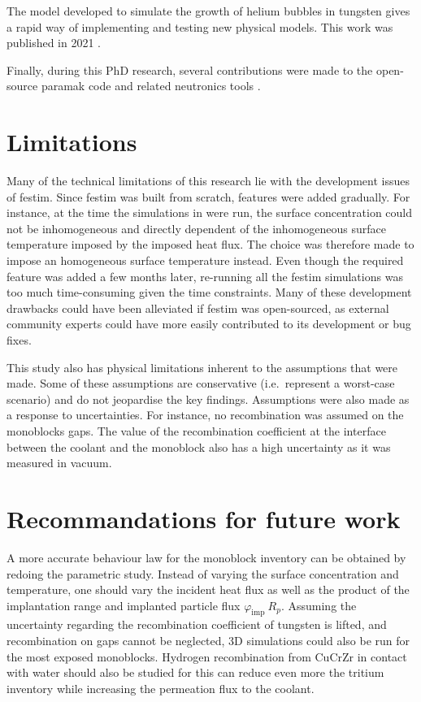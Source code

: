 The model developed to simulate the growth of helium bubbles in tungsten gives a rapid way of implementing and testing new physical models.
This work was published in 2021 \cite{delaporte-mathurin_influence_2021}.

Finally, during this PhD research, several contributions were made to the open-source \gls{paramak} code and related neutronics tools \cite{shimwell_paramak_2021}.

\section*{Limitations}

Many of the technical limitations of this research lie with the development issues of \gls{festim}.
Since \gls{festim} was built from scratch, features were added gradually.
For instance, at the time the simulations in  were run, the surface concentration could not be inhomogeneous and directly dependent of the inhomogeneous surface temperature imposed by the imposed heat flux.
The choice was therefore made to impose an homogeneous surface temperature instead.
Even though the required feature was added a few months later, re-running all the \gls{festim} simulations was too much time-consuming given the time constraints.
Many of these development drawbacks could have been alleviated if \gls{festim} was open-sourced, as external community experts could have more easily contributed to its development or bug fixes.

This study also has physical limitations inherent to the assumptions that were made.
Some of these assumptions are conservative (i.e.\ represent a worst-case scenario) and do not jeopardise the key findings.
Assumptions were also made as a response to uncertainties.
For instance, no recombination was assumed on the monoblocks gaps.
The value of the recombination coefficient at the interface between the coolant and the monoblock also has a high uncertainty as it was measured in vacuum.


\section*{Recommandations for future work}

A more accurate behaviour law for the monoblock inventory can be obtained by redoing the parametric study.
Instead of varying the surface concentration and temperature, one should vary the incident heat flux as well as the product of the implantation range and implanted particle flux $\varphi_\mathrm{imp} \ R_p$.
Assuming the uncertainty regarding the recombination coefficient of tungsten is lifted, and recombination on gaps cannot be neglected, 3D simulations could also be run for the most exposed monoblocks.
Hydrogen recombination from CuCrZr in contact with water should also be studied for this can reduce even more the tritium inventory while increasing the permeation flux to the coolant.

